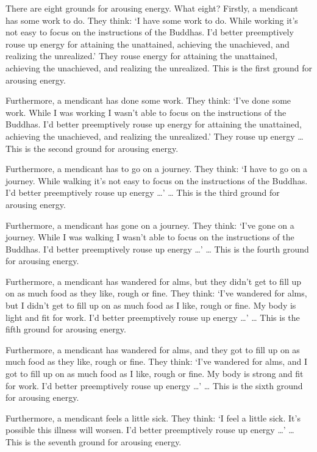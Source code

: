 \documentclass[12pt,openany]{book}%
\begin{document}
There are eight grounds for arousing energy. What eight? Firstly, a mendicant has some work to do. They think: ‘I have some work to do. While working it’s not easy to focus on the instructions of the Buddhas. I’d better preemptively rouse up energy for attaining the unattained, achieving the unachieved, and realizing the unrealized.’ They rouse energy for attaining the unattained, achieving the unachieved, and realizing the unrealized. This is the first ground for arousing energy. 

Furthermore, a mendicant has done some work. They think: ‘I’ve done some work. While I was working I wasn’t able to focus on the instructions of the Buddhas. I’d better preemptively rouse up energy for attaining the unattained, achieving the unachieved, and realizing the unrealized.’ They rouse up energy … This is the second ground for arousing energy. 

Furthermore, a mendicant has to go on a journey. They think: ‘I have to go on a journey. While walking it’s not easy to focus on the instructions of the Buddhas. I’d better preemptively rouse up energy …’ … This is the third ground for arousing energy. 

Furthermore, a mendicant has gone on a journey. They think: ‘I’ve gone on a journey. While I was walking I wasn’t able to focus on the instructions of the Buddhas. I’d better preemptively rouse up energy …’ … This is the fourth ground for arousing energy. 

Furthermore, a mendicant has wandered for alms, but they didn’t get to fill up on as much food as they like, rough or fine. They think: ‘I’ve wandered for alms, but I didn’t get to fill up on as much food as I like, rough or fine. My body is light and fit for work. I’d better preemptively rouse up energy …’ … This is the fifth ground for arousing energy. 

Furthermore, a mendicant has wandered for alms, and they got to fill up on as much food as they like, rough or fine. They think: ‘I’ve wandered for alms, and I got to fill up on as much food as I like, rough or fine. My body is strong and fit for work. I’d better preemptively rouse up energy …’ … This is the sixth ground for arousing energy. 

Furthermore, a mendicant feels a little sick. They think: ‘I feel a little sick. It’s possible this illness will worsen. I’d better preemptively rouse up energy …’ … This is the seventh ground for arousing energy. 
\end{document}
